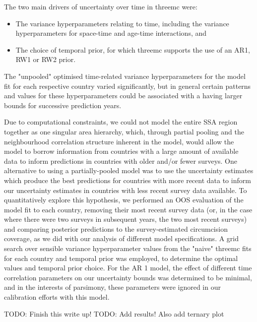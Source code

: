 \documentclass[a4paper, 12pt]{article}
\begin{document}
The two main drivers of uncertainty over time in threemc were:
\begin{itemize}
\item The variance hyperparameters relating to time, including the variance hyperparameters for space-time and age-time interactions, and
\item The choice of temporal prior, for which threemc supports the use of an AR1, RW1 or RW2 prior.
\end{itemize}
The "unpooled" optimised time-related variance hyperparameters for the model fit for each respective country varied significantly, but in general certain patterns and values for these hyperparameters could be associated with a having larger bounds for successive prediction years.

Due to computational constraints, we could not model the entire SSA region together as one singular area hierarchy, which, through partial pooling and the neighbourhood correlation structure inherent in the model, would allow the model to borrow information from countries with a large amount of available data to inform predictions in countries with older and/or fewer surveys.
One alternative to using a partially-pooled model was to use the uncertainty estimates which produce the best predictions for countries with more recent data to inform our uncertainty estimates in countries with less recent survey data available.
To quantitatively explore this hypothesis, we performed an OOS evaluation of the model fit to each country, removing their most recent survey data (or, in the case where there were two surveys in subsequent years, the two most recent surveys) and comparing posterior predictions to the survey-estimated circumcision coverage, as we did with our analysis of different model specifications.
A grid search over sensible variance hyperparameter values from the "naive" threemc fits for each country and temporal prior was employed, to determine the optimal values and temporal prior choice. 
For the AR 1 model, the effect of different time correlation parameters on our uncertainty bounds was determined to be minimal, and in the interests of parsimony, these parameters were ignored in our calibration efforts with this model.

TODO: Finish this write up!
TODO: Add results! Also add ternary plot 
\end{document}
